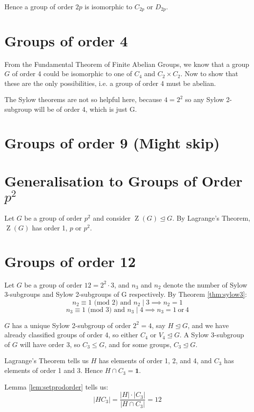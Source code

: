 \documentclass[a4paper, oneside, 12pt, final]{article}
\theoremstyle{definition}
\DeclareMathOperator{\z}{Z}
\begin{document}
Hence a group of order \(2p\) is isomorphic to \(C_{2p}\) or \(D_{2p}\).

\section{Groups of order 4}
From the Fundamental Theorem of Finite Abelian Groups, we know that a group
\(G\) of order 4 could be isomorphic to one of \(C_4\) and \(C_2 \times C_2\).
Now to show that these are the only possibilities, i.e. a group of order 4 must
be abelian.

The Sylow theorems are not so helpful here, because \(4=2^2\) so any Sylow
2-subgroup will be of order 4, which is just G.

\section{Groups of order 9 (Might skip)}

\section{Generalisation to Groups of Order \(p^2\)}
Let \(G\) be a group of order \(p^2\) and consider \(\z{(G)} \unlhd G\).
By Lagrange's Theorem, \(\z{(G)}\) has order 1, \(p\) or \(p^2\).

\section{Groups of order 12}
Let \(G\) be a group of order \(12 = 2^2 \cdot 3\), and \(n_3\) and \(n_2\) denote the number of
Sylow 3-subgroups and Sylow 2-subgroups of G respectively.
By Theorem \ref{thm:sylow3}:
\[n_2 \equiv 1 \text{ (mod 2) and } n_2 \mid 3 \implies n_2 = 1\]
\[n_3 \equiv 1 \text{ (mod 3) and } n_3 \mid 4 \implies n_3 = 1 \ \text{or} \ 4\]

\(G\) has a unique Sylow 2-subgroup of order \(2^2 = 4\), say \(H \unlhd G\),
and we have already classified groups of order 4, so either \(C_4\) or \(V_4
\unlhd G\).
A Sylow 3-subgroup of \(G\) will have order 3, so  \(C_3 \leqslant G\), and for some groups, \(C_3 \unlhd G\).

Lagrange's Theorem tells us \(H\) has elements of order 1, 2, and 4, and \(C_3\) has elements of order 1 and 3.
Hence \(H \cap C_3 = \bm{1}\).

Lemma \ref{lem:setprodorder} tells us:
\[|H C_3| = \frac{|H| \cdot |C_3|}{|H \cap C_3|} = 12\]
\end{document}
